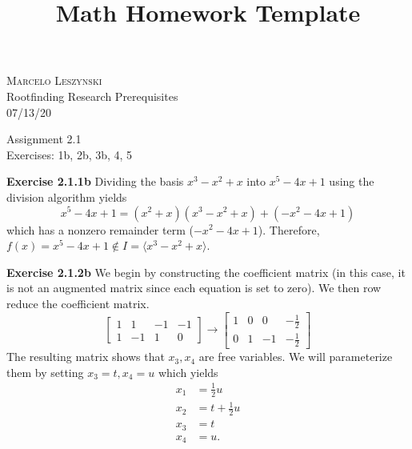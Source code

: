 \documentclass[12pt,oneside]{article}
\newenvironment{exercise}[1]{\vspace{.1in}\noindent\textbf{Exercise #1 \hspace{.05em}}}{}
\begin{document}
\title{Math Homework Template}

\begin{flushright}
\textsc{Marcelo Leszynski}  \\
Rootfinding Research Prerequisites\\
07/13/20
\end{flushright}

\begin{center}
\textsf{Assignment 2.1 } \\
\textsf{Exercises: 1b, 2b, 3b, 4, 5 }
\end{center}


\begin{exercise}{2.1.1b}
    Dividing the basis $x^3-x^2+x$ into $x^5-4x+1$ using the division algorithm
    yields
    \[
        x^5-4x+1=(x^2+x)(x^3-x^2+x)+(-x^2-4x+1)
    \]
    which has a nonzero remainder term ($-x^2-4x+1$). Therefore, 
    $f(x) = x^5-4x+1 \not \in I = \langle x^3-x^2+x \rangle$.
\end{exercise}


\begin{exercise}{2.1.2b}
    We begin by constructing the coefficient matrix (in this case, it 
    is not an augmented matrix since each equation is set to zero). We
    then row reduce the coefficient matrix.
    \[
        \begin{bmatrix}
            1 & 1 & -1 & -1\\
            1 & -1 & 1 & 0
        \end{bmatrix}
        \rightarrow
        \begin{bmatrix}
            1 & 0 & 0 & -\frac{1}{2}\\
            0 & 1 & -1 & -\frac{1}{2}
        \end{bmatrix}
    \]
    The resulting matrix shows that $x_3, x_4$ are free variables. We will 
    parameterize them by setting $x_3 = t, x_4 = u$ which yields
    \begin{align*}
        x_1 &= \frac{1}{2}u\\
        x_2 &= t + \frac{1}{2}u\\
        x_3 &= t\\
        x_4 &= u.
    \end{align*}
\end{exercise}
\end{document}
